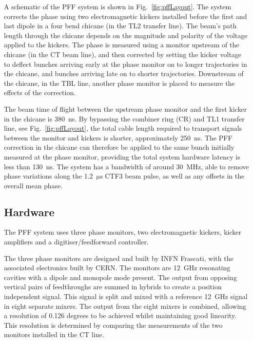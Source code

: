 \documentclass[%
 reprint,
 amsmath,amssymb,
 aps,
]{revtex4-1}
\begin{document}
A schematic of the PFF system is shown in Fig.~\ref{fig:pffLayout}. The system 
corrects the phase using two electromagnetic kickers installed 
before the first and last dipole in a four bend chicane (in the TL2 transfer 
line). The beam's path length 
through the chicane depends on the magnitude and polarity of the voltage 
applied to the kickers. The phase is measured using a monitor upstream of 
the chicane (in the CT beam line), and then corrected by setting the kicker 
voltage to deflect bunches arriving early at the phase monitor on to longer 
trajectories in the chicane, and bunches arriving late on to shorter 
trajectories. Downstream of the chicane, in the TBL line, another phase monitor 
is placed to measure the effects of the correction.

The beam time of flight between the upstream phase monitor and the first kicker 
in the chicane is 380~ns. By bypassing the combiner ring (CR) and TL1 transfer 
line, see Fig.~\ref{fig:pffLayout}, the total cable length required to 
transport signals between the monitor and kickers is shorter, approximately 
250~ns. The PFF correction in the chicane can therefore be applied to the same 
bunch initially measured at the phase monitor, providing the total system 
hardware latency is less than 130~ns. The system has a bandwidth of around 
30~MHz, able to remove phase variations along the 1.2~\(\mathrm{\mu s}\) CTF3 
beam 
pulse, as well as any offsets in the overall mean phase.


\subsection{\label{ss:hardware}Hardware}

The PFF system uses three phase monitors, two electromagnetic kickers, kicker 
amplifiers and a digitiser/feedforward controller.

The three phase monitors are designed and built by INFN Frascati, with the 
associated electronics built by CERN. The monitors are 12~GHz resonating 
cavities with a dipole and monopole mode present. The output from opposing 
vertical pairs of feedthroughs are summed in hybrids to create a position 
independent signal. This signal is split and mixed with a reference 12~GHz 
signal in eight separate mixers. The output from the eight mixers is combined, 
allowing a resolution of 0.126 degrees to be 
achieved whilst maintaining good linearity. This resolution is determined by 
comparing the measurements of the two monitors installed in the CT line.
\end{document}
